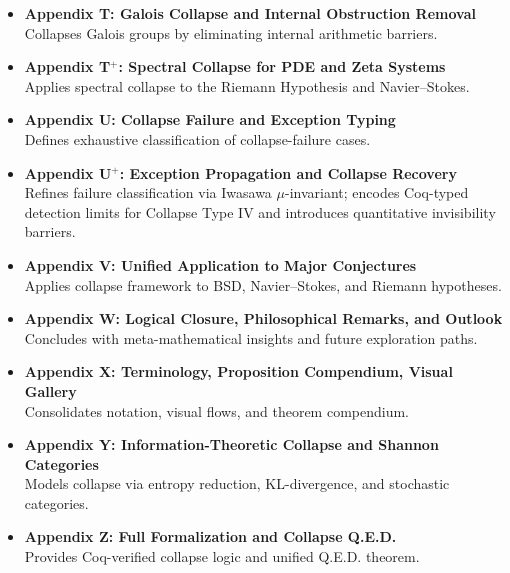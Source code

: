 \documentclass[11pt]{article}
\begin{document}
\begin{itemize}
  \item \textbf{Appendix T: Galois Collapse and Internal Obstruction Removal} \\
  Collapses Galois groups by eliminating internal arithmetic barriers.

  \item \textbf{Appendix T$^+$: Spectral Collapse for PDE and Zeta Systems} \\
  Applies spectral collapse to the Riemann Hypothesis and Navier–Stokes.

  \item \textbf{Appendix U: Collapse Failure and Exception Typing} \\
  Defines exhaustive classification of collapse-failure cases.

  \item \textbf{Appendix U$^+$: Exception Propagation and Collapse Recovery} \\
  Refines failure classification via Iwasawa $\mu$-invariant; encodes Coq-typed detection limits for Collapse Type IV and introduces quantitative invisibility barriers.

  \item \textbf{Appendix V: Unified Application to Major Conjectures} \\
  Applies collapse framework to BSD, Navier–Stokes, and Riemann hypotheses.

  \item \textbf{Appendix W: Logical Closure, Philosophical Remarks, and Outlook} \\
  Concludes with meta-mathematical insights and future exploration paths.

  \item \textbf{Appendix X: Terminology, Proposition Compendium, Visual Gallery} \\
  Consolidates notation, visual flows, and theorem compendium.

  \item \textbf{Appendix Y: Information-Theoretic Collapse and Shannon Categories} \\
  Models collapse via entropy reduction, KL-divergence, and stochastic categories.

  \item \textbf{Appendix Z: Full Formalization and Collapse Q.E.D.} \\
  Provides Coq-verified collapse logic and unified Q.E.D. theorem.

\end{itemize}
\end{document}
